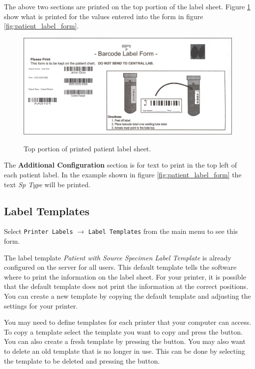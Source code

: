The above two sections are printed on the top portion of the label
sheet. Figure \ref{fig:printed_sheet_top} show what is printed for the values
entered into the form in figure \ref{fig:patient_label_form}.

\begin{figure}[H]
  \centering
  \scalebox{0.2}
	   { \includegraphics*{screenshots/printer_labels/04_printed_patient_labels_top} }
	   \caption{Top portion of printed patient label sheet.}
	   \label{fig:printed_sheet_top}
\end{figure}

The \textbf{Additional Configuration} section is for text to print in the top
left of each patient label. In the example shown in figure
\ref{fig:patient_label_form} the text \emph{Sp Type} will be printed.


\subsection{Label Templates}
\label{sec:label_templates}

Select \texttt{Printer Labels} $\to$ \texttt{Label Templates} from the main
menu to see this form.


The label template \emph{Patient with Source Specimen Label Template} is
already configured on the server for all users. This default template
tells the software where to print the information on the label sheet.  For your
printer, it is possible that the default template does not print the information
at the correct positions. You can create a new template by copying the default
template and adjusting the settings for your printer.

You may need to define templates for each printer that your computer can
access. To copy a template select the template you want to copy and press the
 button. You can also create a fresh template by pressing the
 button. You may also want to delete an old template that is no
longer in use. This can be done by selecting the template to be deleted and
pressing the  button.

